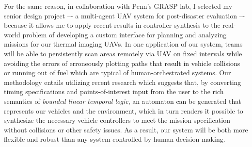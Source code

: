 \documentclass[11pt]{letter}
\begin{document}
For the same reason, in collaboration with Penn’s GRASP lab, I selected my senior design project –- a multi-agent UAV system for post-disaster evaluation –- because it allows me to apply recent results in controller synthesis to the real-world problem of developing a custom interface for planning and analyzing missions for our thermal imaging UAVs.  In one application of our system, teams will be able to persistently scan areas remotely via UAV on fixed intervals while avoiding the errors of erroneously plotting paths that result in vehicle collisions or running out of fuel which are typical of human-orchestrated systems. Our methodology entails utilizing recent research which suggests that, by converting timing specifications and points-of-interest input from the user to the rich semantics of \emph{bounded linear temporal logic}, an automaton can be generated that represents our vehicles and the environment, which in turn renders it possible to synthesize the necessary vehicle controllers to meet the mission specification without collisions or other safety issues.  As a result, our system will be both more flexible and robust than any system controlled by human decision-making.
\end{document}

